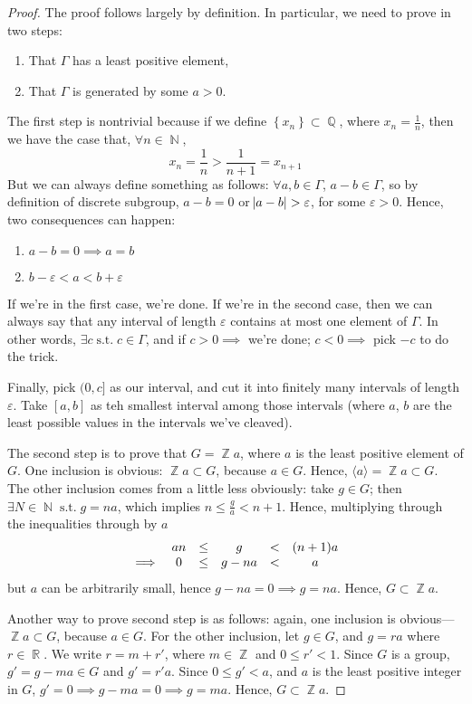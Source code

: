 \documentclass[11pt]{amsart} %
\theoremstyle{definition}
\theoremstyle{definition}
\DeclareMathOperator{\N}{\mathbb{N}}
\DeclareMathOperator{\Q}{\mathbb{Q}}
\DeclareMathOperator{\R}{\mathbb{R}}
\DeclareMathOperator{\Z}{\mathbb{Z}}
\DeclareMathOperator{\suchthat}{\text{ s.t. }}
\numberwithin{equation}{section}
\begin{document}
\begin{proof}
	The proof follows largely by definition. In particular, we need to prove in two steps:
	\begin{enumerate}%
		\item That $\Gamma$ has a least positive element,
		\item That $\Gamma$ is generated by some $a>0$.
	\end{enumerate}

	The first step is nontrivial because if we define $\left\{x_n\right\} \subset \Q$, where $x_n = \frac{1}{n}$, then we have the case that, $\forall n \in \N$,
	$$x_n = \frac{1}{n} > \frac{1}{n+1} = x_{n+1}  $$
	But we can always define something as follows: $\forall a,b \in \Gamma$, $a-b \in \Gamma$, so by definition of discrete subgroup, $a-b=0$ or $\abs{a-b} > \varepsilon$, for some $\varepsilon >0$. Hence, two consequences can happen:
	\begin{enumerate}%
		\item $a-b=0\implies a=b$
		\item $b-\varepsilon < a < b+\varepsilon$
	\end{enumerate}
	If we're in the first case, we're done. If we're in the second case, then we can always say that any interval of length $\varepsilon$ contains at most one element of $\Gamma$. In other words, $\exists c \suchthat c\in \Gamma$, and if $c>0 \implies$ we're done; $c<0 \implies$ pick $-c$ to do the trick.
	
	Finally, pick $(0,c]$ as our interval, and cut it into finitely many intervals of length $\varepsilon$. Take $[a,b]$ as teh smallest interval among those intervals (where $a$, $b$ are the least possible values in the intervals we've cleaved).
	
	The second step is to prove that $G = \Z a$, where $a$ is the least positive element of $G$. One inclusion is obvious: $\Z a \subset G$, because $a \in G$. Hence, $\langle a \rangle = \Z a \subset G$. The other inclusion comes from a little less obviously: take $g \in G$; then $\exists N \in \N \suchthat g = na$, which implies $n \leq \frac{g}{a} < n+1$. Hence, multiplying through the inequalities through by $a$
	$$\begin{array}{c c c c c c}
	& an &\leq & g & < & (n+1)a \\
	\implies & 	0 &\leq & g-na & < & a
	\end{array}$$
	but $a$ can be arbitrarily small, hence $g-na=0 \implies g=na$. Hence, $G \subset \Z a $.
	
	Another way to prove second step is as follows: again, one inclusion is obvious---$\Z a \subset G$, because $a \in G$. For the other inclusion, let $g \in G$, and $g = ra $ where $r\in \R$. We write $r = m + r'$, where $m \in \Z$ and $0 \leq r' <1$. Since $G$ is a group, $g' = g - ma \in G$ and $g' = r' a$. Since $0 \leq g' < a$, and $a$ is the least positive integer in $G$, $g' = 0 \implies g- ma= 0 \implies g= ma$. Hence, $G \subset \Z a$.
\end{proof}
\end{document}
